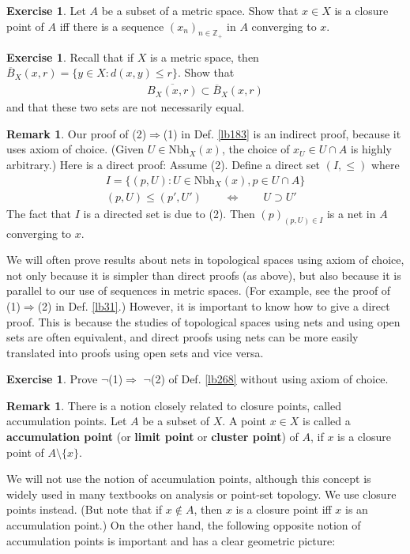 \documentclass[12pt,b5paper,notitlepage]{article}
\theoremstyle{definition}
\newtheorem{exe}[df]{Exercise}
\newtheorem{rem}[df]{Remark}
\theoremstyle{plain}
\newcommand{\ovl}{\overline}
\newcommand{\Zbb}{\mathbb Z}
\newcommand{\Nbh}{\mathrm{Nbh}}
\numberwithin{equation}{section}
\begin{document}
\begin{exe}
Let $A$ be a subset of a metric space. Show that $x\in X$ is a closure point of $A$ iff there is a sequence $(x_n)_{n\in\Zbb_+}$ in $A$ converging to $x$.
\end{exe}

\begin{exe}
Recall that if $X$ is a metric space, then $\ovl B_X(x,r)=\{y\in X:d(x,y)\leq r\}$. Show that 
\begin{align}
\ovl{B_X(x,r)}\subset \ovl B_X(x,r)
\end{align}
and that these two sets are not necessarily equal.
\end{exe}



\begin{rem}\label{lb270}
Our proof of (2)$\Rightarrow$(1) in Def. \ref{lb183} is an indirect proof, because it uses axiom of choice. (Given $U\in\Nbh_X(x)$, the choice of $x_U\in U\cap A$ is highly arbitrary.) Here is a direct proof: Assume (2). Define  a direct set $(I,\leq)$ where
\begin{gather*}
I=\{(p,U):U\in\Nbh_X(x),p\in U\cap A\}\\[0.5ex]
(p,U)\leq(p',U')\qquad\Longleftrightarrow\qquad U\supset U'
\end{gather*} 
The fact that $I$ is a directed set is due to (2). Then $(p)_{(p,U)\in I}$ is a net in $A$ converging to $x$.

We will often prove results about nets in topological spaces using axiom of choice, not only because it is simpler than direct proofs (as above), but also because it is parallel to our use of sequences in metric spaces. (For example, see the proof of (1)$\Rightarrow$(2) in Def. \ref{lb31}.) However, it is important to know how to give a direct proof. This is because the studies of topological spaces using nets and using open sets are often equivalent, and direct proofs using nets can be more easily translated into proofs using open sets and vice versa.   \hfill \qedsymbol
\end{rem}


\begin{exe}
Prove $\neg$(1)$\Rightarrow$ $\neg$(2) of Def. \ref{lb268} without using axiom of choice.
\end{exe}



\begin{rem}\label{lb176}
There is a notion closely related to closure points, called accumulation points. Let $A$ be a subset of $X$. A point $x\in X$ is called a \textbf{accumulation point}   (or \textbf{limit point} or \textbf{cluster point}) of $A$, if $x$ is a closure point of $A\setminus\{x\}$.

We will not use the notion of accumulation points, although this concept is widely used in many textbooks on analysis or point-set topology. We use closure points instead. (But note that if $x\notin A$, then $x$ is a closure point iff $x$ is an accumulation point.) On the other hand, the following opposite notion of accumulation points is important and has a clear geometric picture:   \hfill\qedsymbol
\end{rem}
\end{document}

